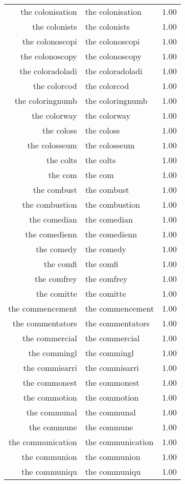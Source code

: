 \begin{table}[ht]
\begin{tabular}{rlr}
  the colonisation & the colonisation & 1.00 \\ 
  the colonists & the colonists & 1.00 \\ 
  the colonoscopi & the colonoscopi & 1.00 \\ 
  the colonoscopy & the colonoscopy & 1.00 \\ 
  the coloradoladi & the coloradoladi & 1.00 \\ 
  the colorcod & the colorcod & 1.00 \\ 
  the coloringnumb & the coloringnumb & 1.00 \\ 
  the colorway & the colorway & 1.00 \\ 
  the coloss & the coloss & 1.00 \\ 
  the colosseum & the colosseum & 1.00 \\ 
  the colts & the colts & 1.00 \\ 
  the com & the com & 1.00 \\ 
  the combust & the combust & 1.00 \\ 
  the combustion & the combustion & 1.00 \\ 
  the comedian & the comedian & 1.00 \\ 
  the comedienn & the comedienn & 1.00 \\ 
  the comedy & the comedy & 1.00 \\ 
  the comfi & the comfi & 1.00 \\ 
  the comfrey & the comfrey & 1.00 \\ 
  the comitte & the comitte & 1.00 \\ 
  the commencement & the commencement & 1.00 \\ 
  the commentators & the commentators & 1.00 \\ 
  the commercial & the commercial & 1.00 \\ 
  the commingl & the commingl & 1.00 \\ 
  the commisarri & the commisarri & 1.00 \\ 
  the commonest & the commonest & 1.00 \\ 
  the commotion & the commotion & 1.00 \\ 
  the communal & the communal & 1.00 \\ 
  the commune & the commune & 1.00 \\ 
  the communication & the communication & 1.00 \\ 
  the communion & the communion & 1.00 \\ 
  the communiqu & the communiqu & 1.00 \\ 

\end{tabular}
\end{table}
